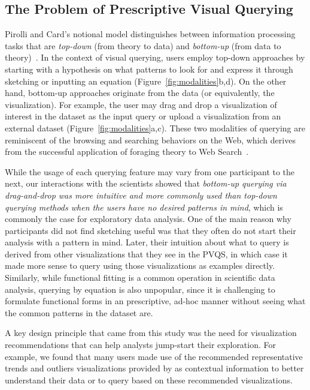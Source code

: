 \subsection{The Problem of Prescriptive Visual Querying}
\par Pirolli and Card's notional model distinguishes between information processing tasks that are \textit{top-down} (from theory to data) and \textit{bottom-up} (from data to theory)~\cite{Pirolli}. In the context of visual querying, users employ top-down approaches by starting with a hypothesis on what patterns to look for and express it through sketching or inputting an equation (Figure~\ref{fig:modalities}b,d). On the other hand, bottom-up approaches originate from the data (or equivalently, the visualization). For example, the user may drag and drop a visualization of interest in the dataset as the input query or upload a visualization from an external dataset (Figure~\ref{fig:modalities}a,c). These two modalities of querying are reminiscent of the browsing and searching behaviors on the Web, which derives from the successful application of foraging theory to Web Search~\cite{Olston2003}.
\par While the usage of each querying feature may vary from one participant to the next, our interactions with the scientists showed that \emph{bottom-up querying via drag-and-drop was more intuitive and more commonly used than top-down querying methods when the users have no desired patterns in mind}, which is commonly the case for exploratory data analysis. One of the main reason why participants did not find sketching useful was that they often do not start their analysis with a pattern in mind. Later, their intuition about what to query is derived from other visualizations that they see in the PVQS, in which case it made more sense to query using those visualizations as examples directly. Similarly, while functional fitting is a common operation in scientific data analysis, querying by equation is also unpopular, since it is challenging to formulate functional forms in an prescriptive, ad-hoc manner without seeing what the common patterns in the dataset are. 
\par A key design principle that came from this study was the need for visualization recommendations that can help analysts jump-start their exploration. For example, we found that many users made use of the recommended representative trends and outliers visualizations provided by \zv as contextual information to better understand their data or to query based on these recommended visualizations. %
